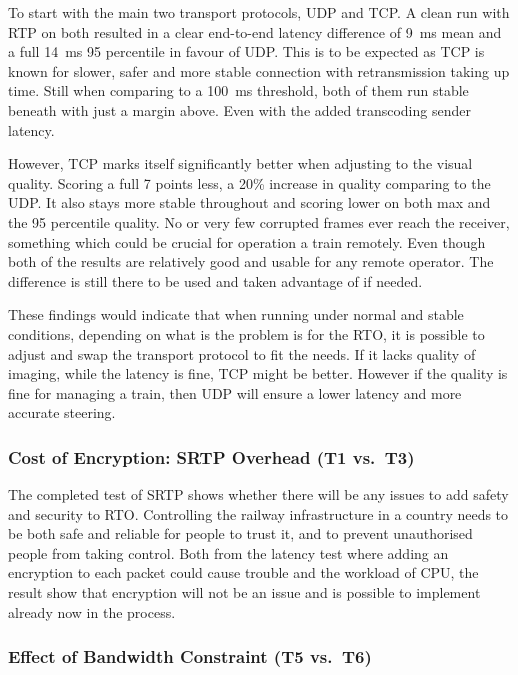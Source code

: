 To start with the main two transport protocols, UDP and TCP. A clean run with RTP on both resulted in a clear end-to-end latency difference of 9~ms mean and a full 14~ms 95 percentile in favour of UDP. This is to be expected as TCP is known for slower, safer and more stable connection with retransmission taking up time. Still when comparing to a 100~ms threshold, both of them run stable beneath with just a margin above. Even with the added transcoding sender latency.

However, TCP marks itself significantly better when adjusting to the visual quality. Scoring a full 7 points less, a 20\% increase in quality comparing to the UDP. It also stays more stable throughout and scoring lower on both max and the 95 percentile quality. No or very few corrupted frames ever reach the receiver, something which could be crucial for operation a train remotely. Even though both of the results are relatively good and usable for any remote operator. The difference is still there to be used and taken advantage of if needed.

These findings would indicate that when running under normal and stable conditions, depending on what is the problem is for the RTO, it is possible to adjust and swap the transport protocol to fit the needs. If it lacks quality of imaging, while the latency is fine, TCP might be better. However if the quality is fine for managing a train, then UDP will ensure a lower latency and more accurate steering.

\subsubsection{Cost of Encryption: SRTP Overhead (T1 vs.\ T3)}\label{subsubsec:srtp}

The completed test of SRTP shows whether there will be any issues to add safety and security to RTO. Controlling the railway infrastructure in a country needs to be both safe and reliable for people to trust it, and to prevent unauthorised people from taking control. Both from the latency test where adding an encryption to each packet could cause trouble and the workload of CPU, the result show that encryption will not be an issue and is possible to implement already now in the process.

\subsubsection{Effect of Bandwidth Constraint (T5 vs.\ T6)}\label{subsubsec:bandwidthDiscussion}

